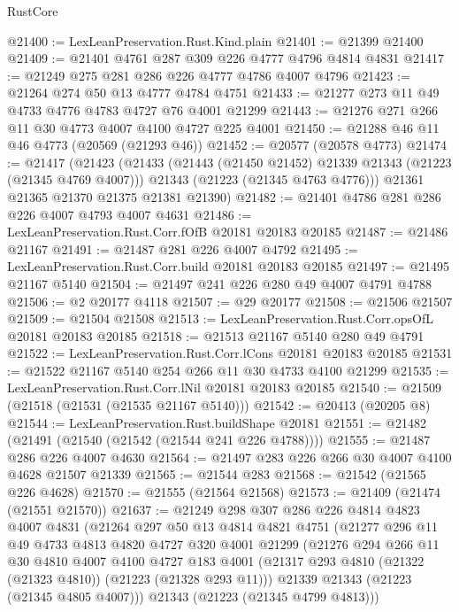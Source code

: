 \begin{lexlean}{RustCore}
\begin{coremodule}
@21400 := LexLeanPreservation.Rust.Kind.plain
@21401 := @21399 @21400
@21409 := @21401 @4761 @287 @309 @226 @4777 @4796 @4814 @4831
@21417 := @21249 @275 @281 @286 @226 @4777 @4786 @4007 @4796
@21423 := @21264 @274 @50 @13 @4777 @4784 @4751
@21433 := @21277 @273 @11 @49 @4733 @4776 @4783 @4727 @76 @4001 @21299
@21443 := @21276 @271 @266 @11 @30 @4773 @4007 @4100 @4727 @225 @4001
@21450 := @21288 @46 @11 @46 @4773 (@20569 (@21293 @46))
@21452 := @20577 (@20578 @4773)
@21474 := @21417
    (@21423
      (@21433
        (@21443 (@21450 @21452) @21339 @21343 (@21223 (@21345 @4769 @4007)))
        @21343
        (@21223 (@21345 @4763 @4776)))
      @21361
      @21365
      @21370
      @21375
      @21381
      @21390)
@21482 := @21401 @4786 @281 @286 @226 @4007 @4793 @4007 @4631
@21486 := LexLeanPreservation.Rust.Corr.fOfB @20181 @20183 @20185
@21487 := @21486 @21167
@21491 := @21487 @281 @226 @4007 @4792
@21495 := LexLeanPreservation.Rust.Corr.build @20181 @20183 @20185
@21497 := @21495 @21167 @5140
@21504 := @21497 @241 @226 @280 @49 @4007 @4791 @4788
@21506 := @2 @20177 @4118
@21507 := @29 @20177
@21508 := @21506 @21507
@21509 := @21504 @21508
@21513 := LexLeanPreservation.Rust.Corr.opsOfL @20181 @20183 @20185
@21518 := @21513 @21167 @5140 @280 @49 @4791
@21522 := LexLeanPreservation.Rust.Corr.lCons @20181 @20183 @20185
@21531 := @21522 @21167 @5140 @254 @266 @11 @30 @4733 @4100 @21299
@21535 := LexLeanPreservation.Rust.Corr.lNil @20181 @20183 @20185
@21540 := @21509 (@21518 (@21531 (@21535 @21167 @5140)))
@21542 := @20413 (@20205 @8)
@21544 := LexLeanPreservation.Rust.buildShape @20181
@21551 := @21482 (@21491 (@21540 (@21542 (@21544 @241 @226 @4788))))
@21555 := @21487 @286 @226 @4007 @4630
@21564 := @21497 @283 @226 @266 @30 @4007 @4100 @4628 @21507 @21339
@21565 := @21544 @283
@21568 := @21542 (@21565 @226 @4628)
@21570 := @21555 (@21564 @21568)
@21573 := @21409 (@21474 (@21551 @21570))
@21637 := @21249
    @298
    @307
    @286
    @226
    @4814
    @4823
    @4007
    @4831
    (@21264
      @297
      @50
      @13
      @4814
      @4821
      @4751
      (@21277
        @296
        @11
        @49
        @4733
        @4813
        @4820
        @4727
        @320
        @4001
        @21299
        (@21276
          @294
          @266
          @11
          @30
          @4810
          @4007
          @4100
          @4727
          @183
          @4001
          (@21317 @293 @4810 (@21322 (@21323 @4810)) (@21223 (@21328 @293 @11)))
          @21339
          @21343
          (@21223 (@21345 @4805 @4007)))
        @21343
        (@21223 (@21345 @4799 @4813)))

\end{coremodule}
\end{lexlean}
